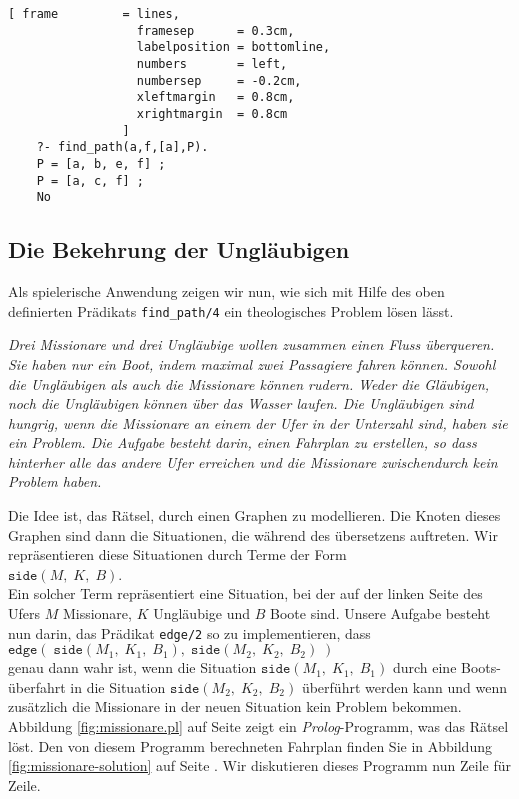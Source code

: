 \begin{Verbatim}[ frame         = lines, 
                  framesep      = 0.3cm, 
                  labelposition = bottomline,
                  numbers       = left,
                  numbersep     = -0.2cm,
                  xleftmargin   = 0.8cm,
                  xrightmargin  = 0.8cm
                ]
    ?- find_path(a,f,[a],P).
    P = [a, b, e, f] ;
    P = [a, c, f] ;    
    No
\end{Verbatim}


\subsection{Die Bekehrung der Ungl\"{a}ubigen}
Als spielerische Anwendung zeigen wir nun, wie sich mit Hilfe des oben definierten Pr\"{a}dikats 
\texttt{find\_path/4} ein theologisches Problem l\"{o}sen l\"{a}sst.
\vspace*{0.3cm}

\begin{minipage}[c]{14cm}
{\sl Drei Missionare und drei Ungl\"{a}ubige wollen zusammen einen Fluss 
\"{u}berqueren. Sie haben nur ein Boot, indem maximal zwei Passagiere fahren k\"{o}nnen.  
Sowohl die Ungl\"{a}ubigen als auch die Missionare k\"{o}nnen rudern.
Weder die Gl\"{a}ubigen, noch die Ungl\"{a}ubigen k\"{o}nnen \"{u}ber das Wasser laufen.
Die Ungl\"{a}ubigen sind hungrig, wenn die Missionare an einem der Ufer in der Unterzahl sind, 
haben sie ein Problem.  Die Aufgabe besteht darin, einen Fahrplan zu 
erstellen, so dass hinterher alle das andere  Ufer erreichen und die
Missionare zwischendurch kein Problem haben.}
\end{minipage}
\vspace*{0.4cm}

\noindent
Die Idee ist, das R\"{a}tsel, durch einen Graphen zu modellieren.  Die Knoten dieses 
Graphen sind dann die Situationen, die w\"{a}hrend des \"{u}bersetzens auftreten.  Wir
repr\"{a}sentieren diese Situationen durch Terme der Form \\[0.1cm]
\hspace*{1.3cm} $\texttt{side}(M,\;K,\;B)$.
\\[0.1cm]
Ein solcher Term repr\"{a}sentiert eine Situation, bei der auf der linken Seite des Ufers $M$ Missionare, $K$
Ungl\"{a}ubige und $B$ Boote sind.  Unsere Aufgabe besteht nun darin, das Pr\"{a}dikat
\texttt{edge/2} so zu implementieren, dass \\[0.1cm]
\hspace*{1.3cm} $\texttt{edge}(\;\texttt{side}(M_1,\;K_1,\;B_1),\;\texttt{side}(M_2,\;K_2,\;B_2)\;)$
\\[0.1cm]
genau dann wahr ist, wenn die Situation $\texttt{side}(M_1,\;K_1,\;B_1)$
durch eine Boots-\"{u}berfahrt in die Situation $\texttt{side}(M_2,\;K_2,\;B_2)$ \"{u}berf\"{u}hrt
werden kann und wenn zus\"{a}tzlich die Missionare in der neuen Situation kein Problem bekommen.
Abbildung \ref{fig:missionare.pl} auf Seite \pageref{fig:missionare.pl}
zeigt ein \textsl{Prolog}-Programm, was das R\"{a}tsel l\"{o}st.  Den von diesem Programm
berechneten Fahrplan finden Sie in Abbildung \ref{fig:missionare-solution} 
auf Seite \pageref{fig:missionare-solution}.
Wir diskutieren dieses Programm nun Zeile f\"{u}r Zeile.

